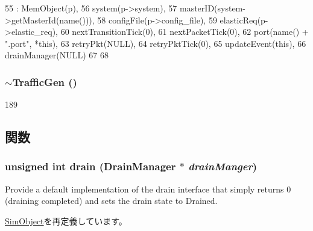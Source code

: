 \begin{DoxyCode}
55     : MemObject(p),
56       system(p->system),
57       masterID(system->getMasterId(name())),
58       configFile(p->config_file),
59       elasticReq(p->elastic_req),
60       nextTransitionTick(0),
61       nextPacketTick(0),
62       port(name() + ".port", *this),
63       retryPkt(NULL),
64       retryPktTick(0),
65       updateEvent(this),
66       drainManager(NULL)
67 {
68 }
\end{DoxyCode}
\hypertarget{classTrafficGen_a5667988c9607ce8d7e3eabd0ebe860f6}{
\subsubsection[{$\sim$TrafficGen}]{\setlength{\rightskip}{0pt plus 5cm}$\sim${\bf TrafficGen} ()}}
\label{classTrafficGen_a5667988c9607ce8d7e3eabd0ebe860f6}



\begin{DoxyCode}
189 {}
\end{DoxyCode}


\subsection{関数}
\hypertarget{classTrafficGen_aa8a18d230dba7a674ac8a0b4f35bc36a}{
\subsubsection[{drain}]{\setlength{\rightskip}{0pt plus 5cm}unsigned int drain ({\bf DrainManager} $\ast$ {\em drainManger})}}
\label{classTrafficGen_aa8a18d230dba7a674ac8a0b4f35bc36a}
Provide a default implementation of the drain interface that simply returns 0 (draining completed) and sets the drain state to Drained. 

\hyperlink{classSimObject_a6bf479c521c7c3eb473822d953275b26}{SimObject}を再定義しています。


